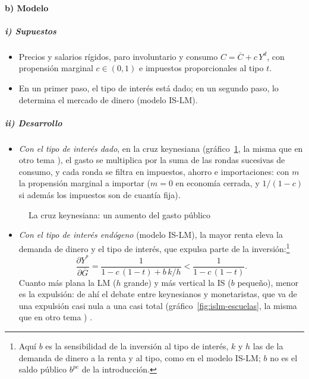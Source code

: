 \documentclass[11pt]{article}
\begin{document}
\paragraph{b) Modelo}

\subparagraph{i) Supuestos}

\begin{itemize}
\item Precios y salarios rígidos, paro involuntario y consumo $C=\overline{C}+c\,Y^d$, con propensión marginal $c\in(0,1)$ e impuestos proporcionales al tipo $t$.
\item En un primer paso, el tipo de interés está dado; en un segundo paso, lo determina el mercado de dinero (modelo IS-LM).
\end{itemize}

\subparagraph{ii) Desarrollo}

\begin{itemize}
\item \emph{Con el tipo de interés dado}, en la cruz keynesiana (gráfico~\ref{fig:cruz-keynesiana}, la misma que en otro tema ), el gasto se multiplica por la suma de las rondas sucesivas de consumo, y cada ronda se filtra en impuestos, ahorro e importaciones:
  con $m$ la propensión marginal a importar ($m=0$ en economía cerrada, y $1/(1-c)$ si además los impuestos son de cuantía fija).
\end{itemize}

\begin{figure}[H]
\centering
\caption{La cruz keynesiana: un aumento del gasto público}\label{fig:cruz-keynesiana}
\end{figure}

\begin{itemize}
\item \emph{Con el tipo de interés endógeno} (modelo IS-LM), la mayor renta eleva la demanda de dinero y el tipo de interés, que expulsa parte de la inversión:\footnote{Aquí $b$ es la sensibilidad de la inversión al tipo de interés, $k$ y $h$ las de la demanda de dinero a la renta y al tipo, como en el modelo IS-LM; $b$ no es el saldo público $b^{pe}$ de la introducción.}
  \begin{equation}
  \frac{\partial Y^*}{\partial\overline{G}}=\frac{1}{1-c\,(1-t)+b\,k/h}<\frac{1}{1-c\,(1-t)}. \label{eq:multiplicador-islm}
  \end{equation}
  Cuanto más plana la LM ($h$ grande) y más vertical la IS ($b$ pequeño), menor es la expulsión: de ahí el debate entre keynesianos y monetaristas, que va de una expulsión casi nula a una casi total (gráfico~\ref{fig:islm-escuelas}, la misma que en otro tema ) .
\end{itemize}
\end{document}
